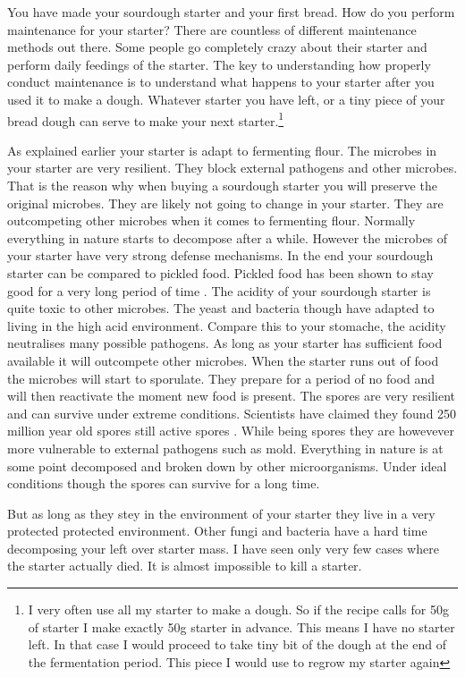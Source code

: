 You have made your sourdough starter and your first bread. How do you perform
maintenance for your starter? There are countless of different maintenance
methods out there. Some people go completely crazy about their starter and
perform daily feedings of the starter. The key to understanding how properly
conduct maintenance is to understand what happens to your starter after you
used it to make a dough. Whatever starter you have left, or a tiny piece of
your bread dough can serve to make your next starter.\footnote{I very often use all my
starter to make a dough. So if the recipe calls for 50g of starter I make
exactly 50g starter in advance. This means I have no starter left. In that
case I would proceed to take tiny bit of the dough at the end of the
fermentation period. This piece I would use to regrow my starter again}


As explained earlier your starter is adapt
to fermenting flour. The microbes in your starter are very resilient. They
block external pathogens and other microbes. That is the reason why when
buying a sourdough starter you will preserve the original microbes. They are
likely not going to change in your starter. They are outcompeting other
microbes when it comes to fermenting flour. Normally everything in nature
starts to decompose after a while. However the microbes of your starter have
very strong defense mechanisms. In the end your sourdough starter can be
compared to pickled food. Pickled food has been shown to stay good for a very
long period of time \cite{pickled+foods+expiration}. The acidity of your sourdough starter is quite
toxic to other microbes. The yeast and bacteria though have adapted to living
in the high acid environment. Compare this to your stomache, the acidity
neutralises many possible pathogens. As long as your starter has sufficient
food available it will outcompete other microbes. When the starter runs out of
food the microbes will start to sporulate. They prepare for a period of no
food and will then reactivate the moment new food is present. The
spores are very resilient and can survive under extreme conditions.
Scientists have claimed they found 250 million year old spores still active
spores \cite{old+spores}. While being spores
they are howevever more vulnerable to external pathogens such as mold.
Everything in nature is at some point decomposed and broken down by other
microorganisms. Under ideal conditions though the spores can survive for a
long time.

But as long as they stey in the environment of your starter they live
in a very protected protected environment. Other fungi and bacteria have a hard time decomposing your left over starter mass.
I have seen only very few cases where the starter actually died. It is almost impossible
to kill a starter.

